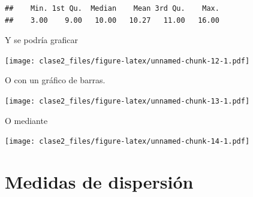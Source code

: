 \documentclass[
]{article}
\newenvironment{Shaded}{\begin{snugshade}}{\end{snugshade}}
\newcommand{\AttributeTok}[1]{\textcolor[rgb]{0.77,0.63,0.00}{#1}}
\newcommand{\DecValTok}[1]{\textcolor[rgb]{0.00,0.00,0.81}{#1}}
\newcommand{\FunctionTok}[1]{\textcolor[rgb]{0.00,0.00,0.00}{#1}}
\newcommand{\NormalTok}[1]{#1}
\newcommand{\SpecialCharTok}[1]{\textcolor[rgb]{0.00,0.00,0.00}{#1}}
\newcommand{\StringTok}[1]{\textcolor[rgb]{0.31,0.60,0.02}{#1}}
\begin{document}
\begin{verbatim}
##    Min. 1st Qu.  Median    Mean 3rd Qu.    Max. 
##    3.00    9.00   10.00   10.27   11.00   16.00
\end{verbatim}

Y se podría graficar

\begin{Shaded}
\end{Shaded}

\texttt{[image: clase2\_files/figure-latex/unnamed-chunk-12-1.pdf]}

O con un gráfico de barras.

\begin{Shaded}
\end{Shaded}

\texttt{[image: clase2\_files/figure-latex/unnamed-chunk-13-1.pdf]}

O mediante

\begin{Shaded}
\end{Shaded}

\texttt{[image: clase2\_files/figure-latex/unnamed-chunk-14-1.pdf]}

\hypertarget{medidas-de-dispersiuxf3n-1}{%
\section{Medidas de dispersión}\label{medidas-de-dispersiuxf3n-1}}
\end{document}
